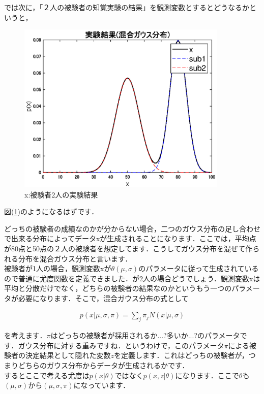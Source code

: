 \documentclass[11pt,a4paper,dvipdfmx]{ujreport}
\begin{document}
では次に，「２人の被験者の知覚実験の結果」を観測変数とするとどうなるかというと，

\begin{figure}[H]
  \centering
  \label{im:gauss-test2}
  \includegraphics[width=10cm]{../figures/test2.eps}
  \caption{x:被験者2人の実験結果}
\end{figure}

図(\ref{im:gauss-test2})のようになるはずです．

どっちの被験者の成績なのかが分からない場合，二つのガウス分布の足し合わせで出来る分布によってデータxが生成されることになります．ここでは，平均点が80点と50点の２人の被験者を想定してます．こうしてガウス分布を混ぜて作られる分布を混合ガウス分布と言います．\\

被験者が1人の場合，観測変数xが$\theta(\mu,\sigma)$のパラメータに従って生成されているので普通に尤度関数を定義できました．が2人の場合どうでしょう．観測変数xは平均と分散だけでなく，どちらの被験者の結果なのかというもう一つのパラメータが必要になります．そこで，混合ガウス分布の式として

\begin{align}
  p(x|\mu,\sigma,\pi) = \sum_j \pi_j N(x|\mu,\sigma)
\end{align}

を考えます．$\pi$はどっちの被験者が採用されるか...?多いか...?のパラメータです．ガウス分布に対する重みですね．というわけで，このパラメータ$\pi$による被験者の決定結果として隠れた変数$z$を定義します．これはどっちの被験者が，つまりどちらのガウス分布からデータが生成されるかです．\\

するとここで考える尤度は$p(x|\theta)$ではなく$p(x,z|\theta)$になります．ここで$\theta$も$(\mu,\sigma)$から$(\mu, \sigma, \pi)$になっています．\\
\end{document}
